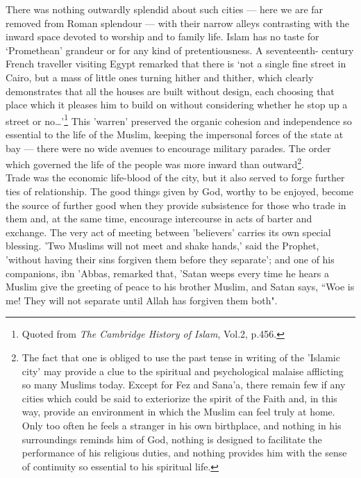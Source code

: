 \documentclass[10pt, twoside,openright]{book}
\begin{document}
There was nothing outwardly splendid about such cities --- here we are far removed from Roman splendour --- with their narrow alleys contrasting with the inward space devoted to worship and to family life. 
Islam has no taste for `Promethean' grandeur or for any kind of pretentiousness. A seventeenth-
century French traveller visiting Egypt remarked that there is `not a single fine street in Cairo, 
but a mass of little ones turning hither and thither, which clearly demonstrates that all the houses 
are built without design, each choosing that place which it pleases him to build on without 
considering whether he stop up a street or no\ldots{}'\footnote{Quoted from \emph{The Cambridge History of Islam}, Vol.2, p.456.} This 'warren' preserved the organic cohesion 
and independence so essential to the life of the Muslim, keeping the impersonal forces of the state 
at bay --- there were no wide avenues to encourage military parades. The order which governed the life 
of the people was more inward than outward\footnote{The fact that one is obliged to use the past tense in writing of the 'Islamic city' may provide a clue to the spiritual and psychological malaise afflicting so many Muslims today. Except for Fez and Sana'a, there remain few if any cities which could be said to exteriorize the spirit of the Faith and, in this way, provide an environment in which the Muslim can feel truly at home. Only too often he feels a stranger in his own birthplace, and nothing in his surroundings reminds him of God, nothing is designed to facilitate the performance of his religious duties, and nothing provides him with the sense of continuity so essential to his spiritual life.}.\\

Trade was the economic life\hyp{}blood of the city, but it also served to forge further ties of 
relationship. The good things given by God, worthy to be enjoyed, become the source of further good 
when they provide subsistence for those who trade in them and, at the same time, encourage 
intercourse in acts of barter and exchange. The very act of meeting between 'believers' carries its 
own special blessing. 'Two Muslims will not meet and shake hands,' said the Prophet, 'without having 
their sins forgiven them before they separate'; and one of his companions, ibn 'Abbas, remarked that, 
'Satan weeps every time he hears a Muslim give the greeting of peace to his brother Muslim, and Satan 
says, ``Woe is me! They will not separate until Allah has forgiven them both". \\
\end{document}
